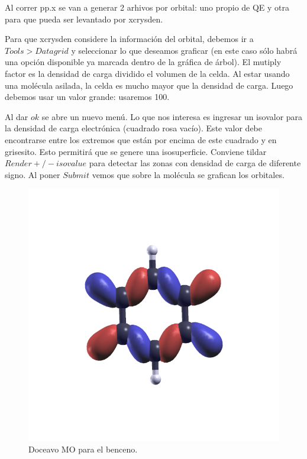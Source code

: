   Al correr pp.x se van a generar 2 arhivos por orbital: uno propio de QE y otra para que pueda ser levantado por xcrysden.

  Para que xcrysden considere la información del orbital, debemos ir a $Tools > Datagrid$ y seleccionar lo que deseamos graficar (en este caso sólo habrá una opción disponible ya marcada dentro de la gráfica de árbol). El mutiply factor es la densidad de carga dividido el volumen de la celda. Al estar usando una molécula asilada, la celda es mucho mayor que la densidad de carga. Luego debemos usar un valor grande: usaremos 100.

  Al dar $ok$ se abre un nuevo menú. Lo que nos interesa es ingresar un isovalor para la densidad de carga electrónica (cuadrado rosa vacío). Este valor debe encontrarse entre los extremos que están por encima de este cuadrado y en grisesito. Esto permitirá que se genere una isosuperficie. Conviene tildar $Render +/- isovalue$ para detectar las zonas con densidad de carga de diferente signo. Al poner $Submit$ vemos que sobre la molécula se grafican los orbitales.


  \begin{figure}[H]
      \centering
      \includegraphics[scale = 0.4]{figs/D1/psi2.benzene.png}
      \caption{Doceavo MO para el benceno.}
  \end{figure}

